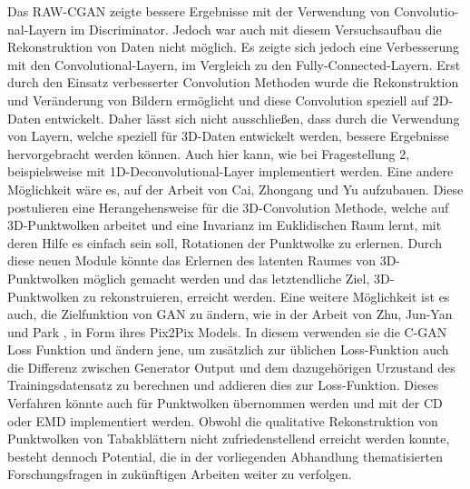\documentclass{llncs}
\begin{document}
\pagebreak\linebreak 
Das RAW-CGAN zeigte bessere Ergebnisse mit der Verwendung von Convolutio-nal-Layern im Discriminator. Jedoch war auch mit diesem Versuchsaufbau die Rekonstruktion von Daten nicht möglich. Es zeigte sich jedoch eine Verbesserung mit den Convolutional-Layern, im Vergleich zu den Fully-Connected-Layern. Erst durch den Einsatz verbesserter Convolution Methoden wurde die Rekonstruktion und Veränderung von Bildern ermöglicht  \cite{imagerecon} und diese Convolution speziell auf 2D-Daten entwickelt. Daher lässt sich nicht ausschließen, dass durch die Verwendung von Layern, welche speziell für 3D-Daten entwickelt werden, bessere Ergebnisse hervorgebracht werden können. Auch hier kann, wie bei Fragestellung 2, beispielsweise mit 1D-Deconvolutional-Layer implementiert werden. Eine andere Möglichkeit wäre es, auf der Arbeit von Cai, Zhongang  und Yu \cite{3d-conv} aufzubauen. Diese postulieren eine Herangehensweise für die 3D-Convolution Methode, welche auf 3D-Punktwolken arbeitet und eine Invarianz im Euklidischen Raum lernt, mit deren Hilfe es einfach sein soll, Rotationen der Punktwolke zu erlernen. Durch diese neuen Module könnte das Erlernen des latenten Raumes von 3D-Punktwolken möglich gemacht werden und das letztendliche Ziel, 3D-Punktwolken zu rekonstruieren, erreicht werden.  Eine weitere Möglichkeit ist es auch, die Zielfunktion von GAN zu ändern, wie in der Arbeit von Zhu, Jun-Yan und Park \cite{pix2pix}, in Form ihres Pix2Pix Models. In diesem verwenden sie die C-GAN Loss Funktion und ändern jene, um zusätzlich zur üblichen Loss-Funktion auch die Differenz zwischen Generator Output und dem dazugehörigen Urzustand des Trainingsdatensatz zu berechnen und addieren dies zur Loss-Funktion. Dieses Verfahren könnte auch für Punktwolken übernommen werden und mit der CD oder EMD implementiert werden. Obwohl die qualitative Rekonstruktion von Punktwolken von Tabakblättern nicht zufriedenstellend erreicht werden konnte, besteht dennoch Potential, die in der vorliegenden Abhandlung thematisierten Forschungsfragen in zukünftigen Arbeiten weiter zu verfolgen.
\newpage
\listoffigures
\newpage
\end{document}

